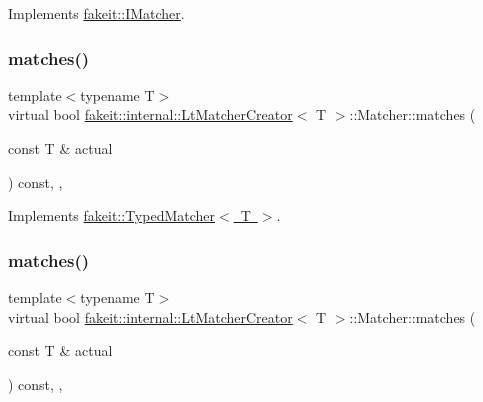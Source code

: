 Implements \mbox{\hyperlink{structfakeit_1_1IMatcher_a409d414a042236dc5e05e241dfd24a67}{fakeit\+::\+I\+Matcher}}.

\mbox{\label{structfakeit_1_1internal_1_1LtMatcherCreator_1_1Matcher_a0c1ba926c3b7b8f3aa1db50a55aa1a1d}} 
\subsubsection{\texorpdfstring{matches()}{matches()}\hspace{0.1cm}{\footnotesize\ttfamily [1/9]}}
{\footnotesize\ttfamily template$<$typename T$>$ \\
virtual bool \mbox{\hyperlink{structfakeit_1_1internal_1_1LtMatcherCreator}{fakeit\+::internal\+::\+Lt\+Matcher\+Creator}}$<$ T $>$\+::Matcher\+::matches (\begin{DoxyParamCaption}\item[{const T \&}]{actual }\end{DoxyParamCaption}) const\hspace{0.3cm}{\ttfamily [inline]}, {\ttfamily [override]}, {\ttfamily [virtual]}}



Implements \mbox{\hyperlink{structfakeit_1_1TypedMatcher_ac553bb6ac7c98a489c92fa6ace0f2e2b}{fakeit\+::\+Typed\+Matcher$<$ T $>$}}.

\mbox{\label{structfakeit_1_1internal_1_1LtMatcherCreator_1_1Matcher_a0c1ba926c3b7b8f3aa1db50a55aa1a1d}} 
\subsubsection{\texorpdfstring{matches()}{matches()}\hspace{0.1cm}{\footnotesize\ttfamily [2/9]}}
{\footnotesize\ttfamily template$<$typename T$>$ \\
virtual bool \mbox{\hyperlink{structfakeit_1_1internal_1_1LtMatcherCreator}{fakeit\+::internal\+::\+Lt\+Matcher\+Creator}}$<$ T $>$\+::Matcher\+::matches (\begin{DoxyParamCaption}\item[{const T \&}]{actual }\end{DoxyParamCaption}) const\hspace{0.3cm}{\ttfamily [inline]}, {\ttfamily [override]}, {\ttfamily [virtual]}}



